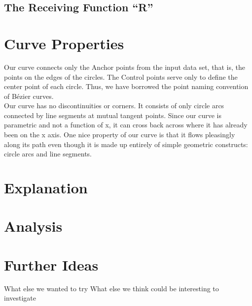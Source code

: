\documentclass{article}
\begin{document}
\subsection{The Receiving Function “R”}


\section{Curve Properties}
Our curve connects only the Anchor points from the input data set, that is, the points on the edges of the circles. The Control points serve only to define the center point of each circle. Thus, we have borrowed the point naming convention  of B\'ezier curves.\\
Our curve has no discontinuities or corners. It consists of only circle arcs connected by line segments at mutual tangent points. Since our curve is parametric and not a function of x, it can cross back across where it has already been on the x axis. One nice property of our curve is that it flows pleasingly along its path even though it is made up entirely of simple geometric constructs: circle arcs and line segments.


\section{Explanation}



\section{Analysis}



\section{Further Ideas}
What else we wanted to try
What else we think could be interesting to investigate
\end{document}
